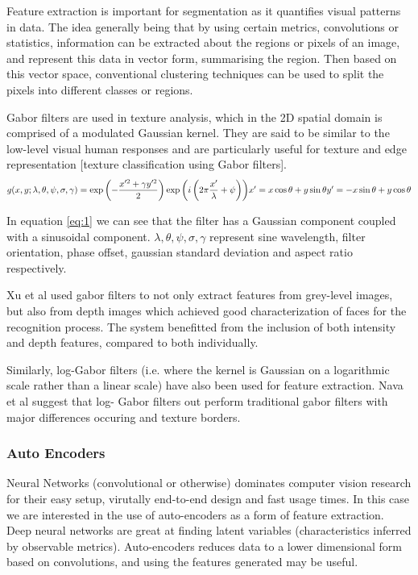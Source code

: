 \documentclass[a4]{article}
\begin{document}
Feature extraction is important for segmentation as it quantifies visual patterns in data. The idea generally being that by using certain metrics, convolutions or statistics, information can be extracted about the regions or pixels of an image, and represent this data in vector form, summarising the region. Then based on this vector space, conventional clustering techniques can be used to split the pixels into different classes or regions. 

  

Gabor filters are used in texture analysis, which in the 2D spatial domain is comprised of a modulated Gaussian kernel. They are said to be similar to the low-level visual human responses \cite{jones1987evaluation} and are particularly useful for texture and edge representation [texture classification using Gabor filters]. 
\begin{equation} \label{eq:1}
g(x,y;\lambda,\theta,\psi,\sigma,\gamma)=\exp \left(-\frac{x'^2+\gamma y'^2}{2}\right) \exp \left( i\left(2\pi \frac{x'}{\lambda}+\psi\right) \right)$$$$
x' = x \cos\theta +y\sin\theta$$$$
y' = -x\sin\theta +y\cos\theta
\end{equation}

In equation \ref{eq:1} we can see that the filter has a Gaussian component coupled with a sinusoidal component. $\lambda,\theta,\psi,\sigma,\gamma$ represent sine wavelength, filter orientation, phase offset, gaussian standard deviation and aspect ratio respectively.

Xu et al \cite{xu2009automatic} used gabor filters to not only extract features from grey-level images, but also from depth images which achieved good characterization of faces for the recognition process. The system benefitted from the inclusion of both intensity and depth features, compared to both individually. 

  

Similarly, log-Gabor filters (i.e. where the kernel is Gaussian on a logarithmic scale rather than a linear scale) have also been used for feature extraction. Nava et al \cite{nava2011comparison} suggest that log- Gabor filters out perform traditional gabor filters with major differences occuring and texture borders. 

 
\subsubsection*{Auto Encoders}

Neural Networks (convolutional or otherwise) dominates computer vision research for their easy setup, virutally end-to-end design and fast usage times. In this case we are interested in the use of auto-encoders as a form of feature extraction. Deep neural networks are great at finding latent variables (characteristics inferred by observable metrics). Auto-encoders reduces data to a lower dimensional form based on convolutions, and using the features generated may be useful.
\end{document}

